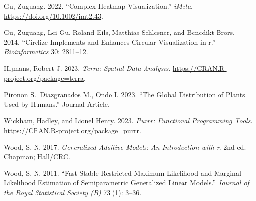 \documentclass[
]{article}
\newlength{\cslhangindent}
\newlength{\cslentryspacingunit} %
\newenvironment{CSLReferences}[2] %
 {%
  \setlength{\parindent}{0pt}
  \ifodd #1
  \let\oldpar\par
  \def\par{\hangindent=\cslhangindent\oldpar}
  \fi
  \setlength{\parskip}{#2\cslentryspacingunit}
 }%
 {}
\begin{document}
\hypertarget{refs}{}
\begin{CSLReferences}{1}{0}
\leavevmode{}%
Gu, Zuguang. 2022. {``Complex Heatmap Visualization.''} \emph{iMeta}.
\url{https://doi.org/10.1002/imt2.43}.

\leavevmode{}%
Gu, Zuguang, Lei Gu, Roland Eils, Matthias Schlesner, and Benedikt
Brors. 2014. {``Circlize Implements and Enhances Circular Visualization
in r.''} \emph{Bioinformatics} 30: 2811--12.

\leavevmode{}%
Hijmans, Robert J. 2023. \emph{Terra: Spatial Data Analysis}.
\url{https://CRAN.R-project.org/package=terra}.

\leavevmode{}%
Pironon S., Diazgranados M., Ondo I. 2023. {``The Global Distribution of
Plants Used by Humans.''} Journal Article.

\leavevmode{}%
Wickham, Hadley, and Lionel Henry. 2023. \emph{Purrr: Functional
Programming Tools}. \url{https://CRAN.R-project.org/package=purrr}.

\leavevmode{}%
Wood, S. N. 2017. \emph{Generalized Additive Models: An Introduction
with r}. 2nd ed. Chapman; Hall/CRC.

\leavevmode{}%
Wood, S. N. 2011. {``Fast Stable Restricted Maximum Likelihood and
Marginal Likelihood Estimation of Semiparametric Generalized Linear
Models.''} \emph{Journal of the Royal Statistical Society (B)} 73 (1):
3--36.

\end{CSLReferences}
\end{document}
